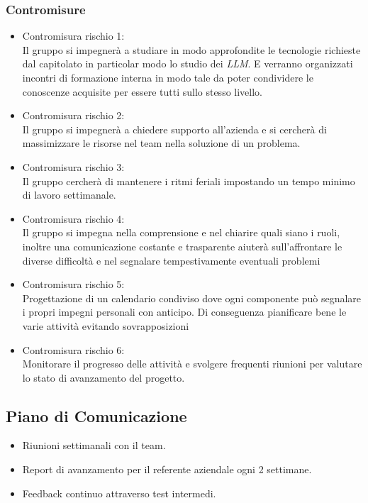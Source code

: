\documentclass{article}
\begin{document}
        \subsubsection{Contromisure}
        \begin{itemize}
            \item{Contromisura rischio 1:\\}
            Il gruppo si impegnerà a studiare in modo approfondite le tecnologie richieste dal capitolato in particolar modo lo studio dei \emph{LLM}. E verranno organizzati incontri di formazione interna in modo tale da poter condividere le conoscenze acquisite per essere tutti sullo stesso livello.
            \item{Contromisura rischio 2:\\}
            Il gruppo si impegnerà a chiedere supporto all'azienda e si cercherà di massimizzare le risorse nel team nella soluzione di un problema.
            \item{Contromisura rischio 3:\\}
            Il gruppo cercherà di mantenere i ritmi feriali impostando un tempo minimo di lavoro settimanale.
            \item{Contromisura rischio 4:\\}
            Il gruppo si impegna nella comprensione e nel chiarire quali siano i ruoli, inoltre una comunicazione costante e trasparente aiuterà sull'affrontare le diverse difficoltà e nel segnalare tempestivamente eventuali problemi
            \item{Contromisura rischio 5:\\}
            Progettazione di un calendario condiviso dove ogni componente può segnalare i propri impegni personali con anticipo. Di conseguenza pianificare bene le varie attività evitando sovrapposizioni
            \item{Contromisura rischio 6:\\}
            Monitorare il progresso delle attività e svolgere frequenti riunioni per valutare lo stato di avanzamento del progetto. 
        \end{itemize}

    \subsection{Piano di Comunicazione}
    \begin{itemize}
        \item Riunioni settimanali con il team.
        \item Report di avanzamento per il referente aziendale ogni 2 settimane.
        \item Feedback continuo attraverso test intermedi.
    \end{itemize}
\end{document}
